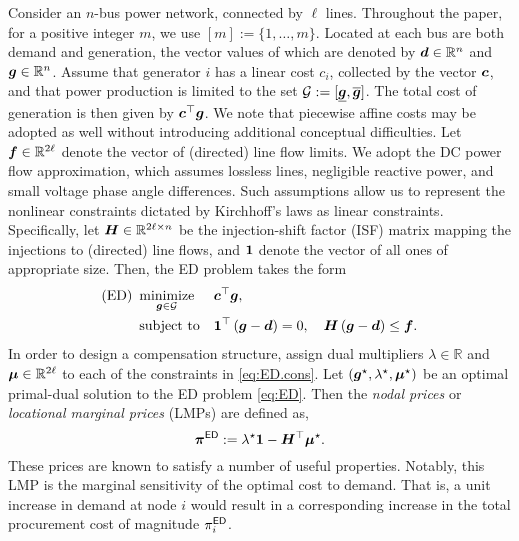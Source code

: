 Consider an $n$-bus power network, connected by $\ell$ lines. Throughout the paper, for a positive integer $m$, we use $[m]:=\{1,\dots,m\}$. 
Located at each bus are both demand and generation, the vector values of which are denoted by ${\bm{d}} \in \mathbb{R}^n$ and ${\bm{g}} \in \mathbb{R}^n$. Assume that generator $i$ has a linear cost $c_i$, collected by the vector ${\bm{c}}$,
and that power production is limited to the set ${\cal G} := [\underline{{\bm{g}}}, \overline{{\bm{g}}}]$. The total cost of generation is then given by ${\bm{c}}^\top {\bm{g}}$. We note that piecewise affine costs may be adopted as well without introducing additional conceptual difficulties. Let ${\bm{f}} \in \mathbb{R}^{2\ell}$ denote the vector of (directed) line flow limits. We adopt the DC power flow approximation, which assumes lossless lines, negligible reactive power, and small voltage phase angle differences. Such assumptions allow us to represent the nonlinear constraints dictated by  Kirchhoff's laws as linear constraints. Specifically, let ${\bm{H}} \in \mathbb{R}^{2 \ell \times n}$ be the injection-shift factor (ISF) matrix mapping the injections to (directed) line flows, and $\mathbf{1}$ denote the vector of all ones of appropriate size. Then, the ED problem takes the form
\begin{subequations}
\begin{align}
    \text{(ED)}\,\,\,&\underset{{\bm{g}} \in {\cal G}}{\text{minimize}} && {\bm{c}}^\top {\bm{g}}, \label{eq:ED.obj} \\
    &\text{subject to} && \mathbf{1}^\top \left({\bm{g}} - {\bm{d}}\right) = 0, \quad {\bm{H}} \left( {\bm{g}} - {\bm{d}} \right) \le {\bm{f}}. \label{eq:ED.cons}
\end{align}
\label{eq:ED}
\end{subequations}
In order to design a compensation structure,
assign dual multipliers $\lambda \in \mathbb{R}$ and ${\bm{\mu}} \in \mathbb{R}^{2\ell}$ to each of the constraints in \eqref{eq:ED.cons}. Let $({\bm{g}}^\star, \lambda^\star, {\bm{\mu}}^\star)$ be an optimal primal-dual solution to the ED problem \eqref{eq:ED}. Then the \emph{nodal prices} or \emph{locational marginal prices} (LMPs) are defined as,
\begin{equation}\label{eq:ED_LMP}
    {\bm{\pi}}^{{\sf ED}} := \lambda^\star \mathbf{1} - {\bm{H}}^\top {\bm{\mu}}^\star.
\end{equation}
These prices are known to satisfy a number of useful properties. Notably, this LMP is the marginal sensitivity of the optimal cost to demand. That is, a unit increase in demand at node $i$ would result in a corresponding increase in the total procurement cost of magnitude $\pi^{{\sf ED}}_i$.

